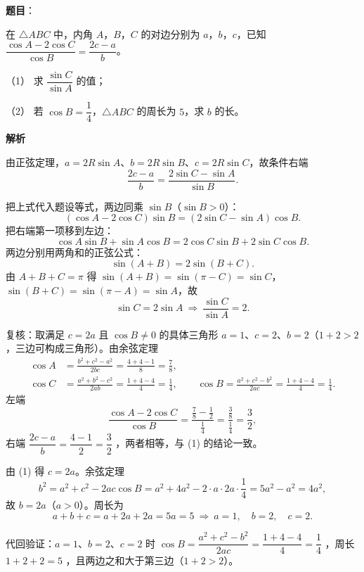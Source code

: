 \begin{answer}

\textbf{题目}：

在 $\triangle ABC$ 中，内角 $A$，$B$，$C$ 的对边分别为 $a$，$b$，$c$，已知 $\dfrac{\cos A-2\cos C}{\cos B}=\dfrac{2c-a}{b}$。

（1） 求 $\dfrac{\sin C}{\sin A}$ 的值；

（2） 若 $\cos B=\dfrac14$，$\triangle ABC$ 的周长为 $5$，求 $b$ 的长。

\textbf{解析}

由正弦定理，$a=2R\sin A$、$b=2R\sin B$、$c=2R\sin C$，故条件右端
\nopagebreak[4]
\[
\frac{2c-a}{b}=\frac{2\sin C-\sin A}{\sin B}.
\]


把上式代入题设等式，两边同乘 $\sin B$（$\sin B>0$）：
\nopagebreak[4]
\[
(\cos A-2\cos C)\sin B=(2\sin C-\sin A)\cos B.
\]
把右端第一项移到左边：
\nopagebreak[4]
\[
\cos A\sin B+\sin A\cos B=2\cos C\sin B+2\sin C\cos B.
\]
两边分别用两角和的正弦公式：
\nopagebreak[4]
\[
\sin(A+B)=2\sin(B+C).
\]
由 $A+B+C=\pi$ 得 $\sin(A+B)=\sin(\pi-C)=\sin C$，$\sin(B+C)=\sin(\pi-A)=\sin A$，故
\nopagebreak[4]
\[
\sin C=2\sin A\ \Longrightarrow\ \frac{\sin C}{\sin A}=2.
\]

复核：取满足 $c=2a$ 且 $\cos B\neq0$ 的具体三角形 $a=1$、$c=2$、$b=2$（$1+2>2$，三边可构成三角形）。由余弦定理
\nopagebreak[4]
\[
\begin{aligned}
\cos A&=\frac{b^2+c^2-a^2}{2bc}=\frac{4+4-1}{8}=\frac78,\\
\cos C&=\frac{a^2+b^2-c^2}{2ab}=\frac{1+4-4}{4}=\frac14,\qquad
\cos B=\frac{a^2+c^2-b^2}{2ac}=\frac{1+4-4}{4}=\frac14.
\end{aligned}
\]
左端
\nopagebreak[4]
\[
\frac{\cos A-2\cos C}{\cos B}=\frac{\frac78-\frac12}{\frac14}=\frac{\frac38}{\frac14}=\frac32,
\]
右端 $\dfrac{2c-a}{b}=\dfrac{4-1}{2}=\dfrac32$ ，两者相等，与 (1) 的结论一致。


由 (1) 得 $c=2a$。余弦定理
\nopagebreak[4]
\[
b^2=a^2+c^2-2ac\cos B=a^2+4a^2-2\cdot a\cdot2a\cdot\frac14=5a^2-a^2=4a^2,
\]
故 $b=2a$（$a>0$）。周长为
\nopagebreak[4]
\[
a+b+c=a+2a+2a=5a=5\ \Longrightarrow\ a=1,\quad b=2,\quad c=2.
\]

代回验证：$a=1$、$b=2$、$c=2$ 时 $\cos B=\dfrac{a^2+c^2-b^2}{2ac}=\dfrac{1+4-4}{4}=\dfrac14$ ，周长 $1+2+2=5$ ，且两边之和大于第三边（$1+2>2$）。



\end{answer}
